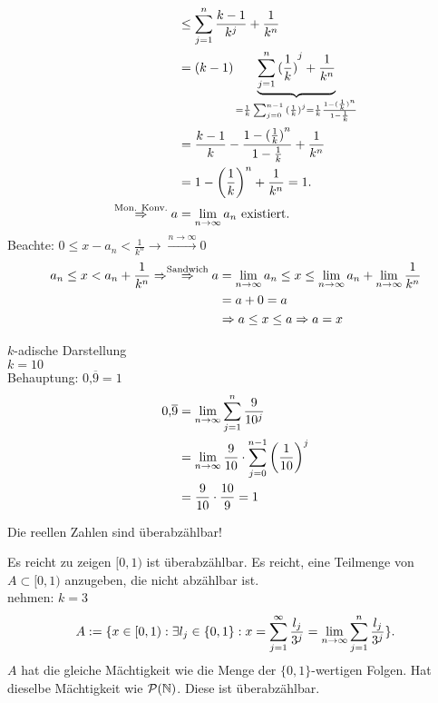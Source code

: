 \documentclass[../ana1.tex]{subfiles}
\begin{document}
\begin{bsp}
\begin{align*}
		&\leq \sum_{j=1}^{n} \frac{k-1}{k^j} + \frac{1}{k^n}\\
		&= (k-1)\underbrace{ \sum_{j=1}^{n} {( \frac{1}{k})}^j + \frac{1}{k^n} }_{= \frac{1}{k} \sum_{j=0}^{n-1} {(\frac{1}{k})}^j = \frac{1}{k} \frac{1-{(\frac{1}{k})}^n}{1-\frac{1}{k}} }\\
		&=\frac{k-1}{k}-\frac{1-{(\frac{1}{k})}^n}{1-\frac{1}{k}} + \frac{1}{k^n}\\
		&= 1- {\left(\frac{1}{k}\right)}^n + \frac{1}{k^n} = 1.\\
		\overset{\text{Mon. Konv.}}{\Rightarrow} a &= \lim\limits_{n\rightarrow\infty} a_n \text{ existiert.}\\
	\end{align*}
	Beachte: \(0 \leq x-a_n < \frac{1}{k^n} \rightarrow\overset{n \rightarrow \infty}{\rightarrow} 0\) \\	 
	\begin{align*}
		a_n \leq x < a_n + \frac{1}{k^n} \Rightarrow\overset{\text{Sandwich}}{\Rightarrow}
		a &= \lim\limits_{n\rightarrow\infty} a_n \leq x \leq \lim\limits_{n\rightarrow\infty} a_n + \lim\limits_{n\rightarrow\infty} \frac{1}{k^n}\\
		&= a + 0 = a\\
		&\Rightarrow a \leq x \leq a \Rightarrow a = x
	\end{align*}
\end{bsp}
\begin{bsp}
	\(k\)-adische Darstellung\\
	\(k = 10\) \\
	Behauptung: \(0\text{,}\overline{9} = 1\)
	\begin{align*}
		0\text{,}\overline{9} &= \lim\limits_{n\rightarrow\infty} \sum_{j=1}^{n} \frac{9}{10^j}\\
		&=\lim\limits_{n\rightarrow\infty} \frac{9}{10}\cdot \sum_{j=0}^{n-1}{\left(\frac{1}{10}\right)}^j\\
		&=\frac{9}{10}\cdot\frac{10}{9} = 1
	\end{align*}
\end{bsp}
\begin{kor}
	Die reellen Zahlen sind überabzählbar!
\end{kor}
\begin{bew}
	Es reicht zu zeigen \( [0,1) \) ist überabzählbar. Es reicht, eine Teilmenge von \(A \subset [0,1) \) anzugeben, die nicht abzählbar ist.\\
	nehmen: \(k=3\)
	\[ A:= \{ x\in[0,1) : \exists l_j \in \{0,1 \}: x = \sum_{j=1}^{\infty} \frac{l_j}{3^j} = \lim\limits_{n\rightarrow\infty} \sum_{j=1}^{n}\frac{l_j}{3^j} \}. \]
	\(A\) hat die gleiche Mächtigkeit wie die Menge der \( \{0,1\} \)-wertigen Folgen. Hat dieselbe Mächtigkeit wie \(\mathcal{P}(\mathbb{N})\). Diese ist überabzählbar.
\end{bew}
\end{document}
